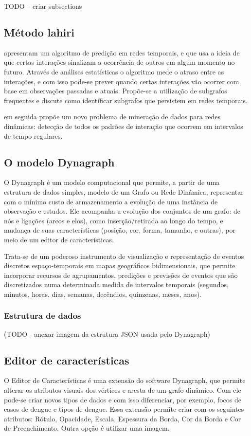 TODO -- criar subsections 
\subsection{Método lahiri}
\label{lahiri}
\cite{lahiri2007} apresentam um algoritmo de predição em redes temporais, e que usa a ideia de que certas interações sinalizam a ocorrência de outros em algum momento no futuro. Através de análises estatísticas o algoritmo mede o atraso entre as interações, e com isso pode-se prever quando certas interações vão ocorrer com base em observações passadas e atuais. Propõe-se a utilização de subgrafos frequentes e discute como identificar subgrafos que persistem em redes temporais. 

\cite{lahiri2008} em seguida propõe um novo problema de mineração de dados para redes dinâmicas: detecção de todos os padrões de interação que ocorrem em intervalos de tempo regulares.
 
\subsection{O modelo Dynagraph}

O Dynagraph \cite{dynagraph} é um modelo computacional que permite, a partir de uma estrutura de dados simples, modelo de um Grafo ou Rede Dinâmica, representar com o mínimo custo de armazenamento a evolução de uma instância de observação e estudos. Ele acompanha a evolução dos conjuntos de um grafo: de nós e ligações (arcos e elos), como inserção/retirada ao longo do tempo, e mudança de suas características (posição, cor, forma, tamanho, e outras), por meio de um editor de características.

Trata-se de um poderoso instrumento de visualização e representação de eventos discretos espaço-temporais em mapas geográficos bidimensionais, que permite incorporar recursos de agrupamentos, predições e previsões de eventos que são discretizados numa determinada medida de intervalos temporais (segundos, minutos, horas, dias, semanas, decêndios, quinzenas, meses, anos).

\subsubsection{Estrutura de dados}

(TODO - anexar imagem da estrutura JSON usada pelo Dynagraph)

\subsection{Editor de características}
O Editor de Características é uma extensão do software Dynagraph, que permite alterar os atributos visuais dos vértices e aresta de um grafo dinâmico.
Com ele pode-se criar novos tipos de dados e com isso diferenciar, por exemplo, focos de casos de dengue e tipos de dengue.
Essa extensão permite criar com os seguintes atributos: Rótulo, Opacidade, Escala, Espessura da Borda, Cor da Borda e Cor de Preenchimento. Outra opção é utilizar uma imagem.
 
